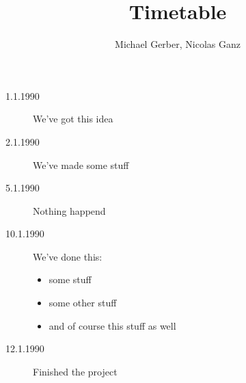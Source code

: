 %
%
%
%







\title{Timetable} %
\author{Michael Gerber, Nicolas Ganz } %
\maketitle %

\begin{description}
  \item[1.1.1990] We've got this idea
  \item[2.1.1990] We've made some stuff
  \item[5.1.1990] Nothing happend
  \item[10.1.1990] We've done this:
    \begin{itemize}
      \item some stuff
      \item some other stuff
      \item and of course this stuff as well
    \end{itemize}
  \item[12.1.1990] Finished the project
\end{description}

